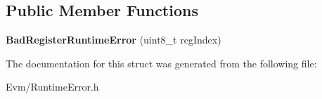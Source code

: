 \subsection*{Public Member Functions}
\begin{DoxyCompactItemize}
\item 
\mbox{\label{struct_evm_1_1_bad_register_runtime_error_adab23c579d16fb4e9e327fdfbc3f7395}} 
{\bfseries Bad\+Register\+Runtime\+Error} (uint8\+\_\+t reg\+Index)
\end{DoxyCompactItemize}


The documentation for this struct was generated from the following file\+:\begin{DoxyCompactItemize}
\item 
Evm/Runtime\+Error.\+h\end{DoxyCompactItemize}
